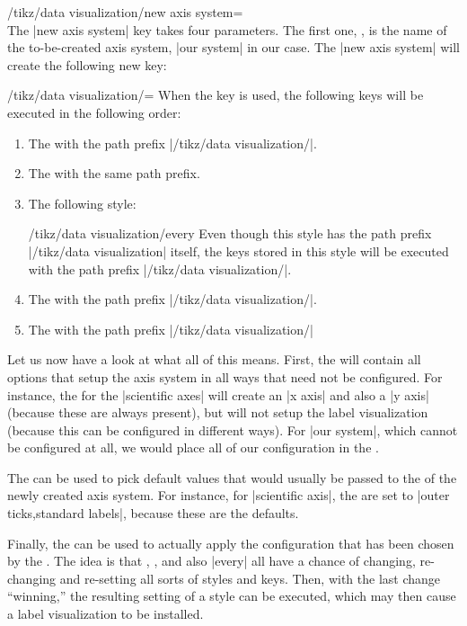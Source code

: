 \begin{key}{/tikz/data visualization/new axis system=\\ } 
  The |new axis system| key takes four parameters. The first one,
  , is the name of the to-be-created axis system,
  |our system| in our case. The |new axis system| will create the
  following new key:
  \begin{key}{/tikz/data visualization/=}
    When the key  is used, the following keys
    will be executed in the following order:
    \begin{enumerate}
    \item
      The  with the path prefix |/tikz/data visualization/|.
    \item
      The  with the same path prefix.
    \item
      The following style:
      \begin{stylekey}{/tikz/data visualization/every }
        Even though this style has the path prefix
        |/tikz/data visualization| itself, the keys stored in this
        style will be executed with the path prefix
        |/tikz/data visualization/|.
      \end{stylekey}
    \item
      The  with the path prefix
      |/tikz/data visualization/|.
    \item
      The  with the path prefix |/tikz/data visualization/|
    \end{enumerate}
  \end{key}

  Let us now have a look at what all of this means. First, the
   will contain all options that setup the axis
  system in all ways that need not be configured. For instance, the
   for the |scientific axes| will create an |x axis|
  and also a |y axis| (because these are always present), but will not
  setup the label visualization (because this can be configured in
  different ways). For |our system|, which cannot be configured at
  all, we would place all of our configuration in the .

  The  can be used to pick default values that
  would usually be passed to the  of the newly created
  axis system. For instance, for |scientific axis|, the
   are set to |outer ticks,standard labels|,
  because these are the defaults.

  Finally, the  can be used to actually
  apply the configuration that has been chosen by the
  . The idea is that ,
  , and also |every|  all have a
  chance of changing, re-changing and re-setting all sorts of styles
  and keys. Then, with the last change ``winning,'' the resulting
  setting of a style can be executed, which may then cause a label
  visualization to be installed.
\end{key}
